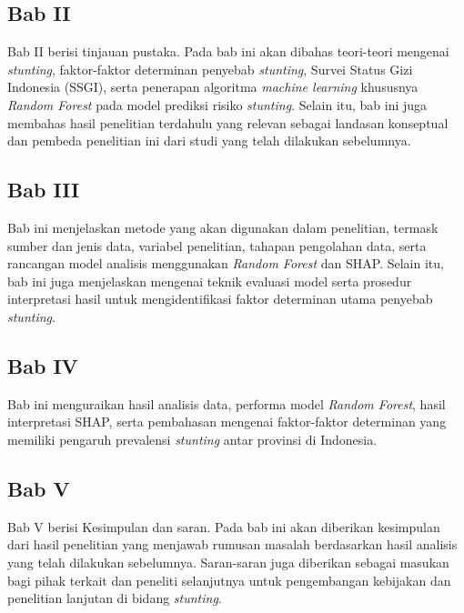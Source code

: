 \subsection*{Bab II}
Bab II berisi tinjauan pustaka. Pada bab ini akan dibahas teori-teori mengenai \textit{stunting}, faktor-faktor determinan penyebab \textit{stunting}, Survei Status Gizi Indonesia (SSGI), serta penerapan algoritma \textit{machine learning} khususnya \textit{Random Forest} pada model prediksi risiko \textit{stunting}. Selain itu, bab ini juga membahas hasil penelitian terdahulu yang relevan sebagai landasan konseptual dan pembeda penelitian ini dari studi yang telah dilakukan sebelumnya.

\subsection*{Bab III}
Bab ini menjelaskan metode yang akan digunakan dalam penelitian, termask sumber dan jenis data, variabel penelitian, tahapan pengolahan data, serta rancangan model analisis menggunakan \textit{Random Forest} dan SHAP. Selain itu, bab ini juga menjelaskan mengenai teknik evaluasi model serta prosedur interpretasi hasil untuk mengidentifikasi faktor determinan utama penyebab \textit{stunting}.

\subsection*{Bab IV}
Bab ini menguraikan hasil analisis data, performa model \textit{Random Forest}, hasil interpretasi SHAP, serta pembahasan mengenai faktor-faktor determinan yang memiliki pengaruh prevalensi \textit{stunting} antar provinsi di Indonesia.

\subsection*{Bab V}
Bab V berisi Kesimpulan dan saran. Pada bab ini akan diberikan kesimpulan dari hasil penelitian yang menjawab rumusan masalah berdasarkan hasil analisis yang telah dilakukan sebelumnya. Saran-saran juga diberikan sebagai masukan bagi pihak terkait dan peneliti selanjutnya untuk pengembangan kebijakan dan penelitian lanjutan di bidang \textit{stunting}.